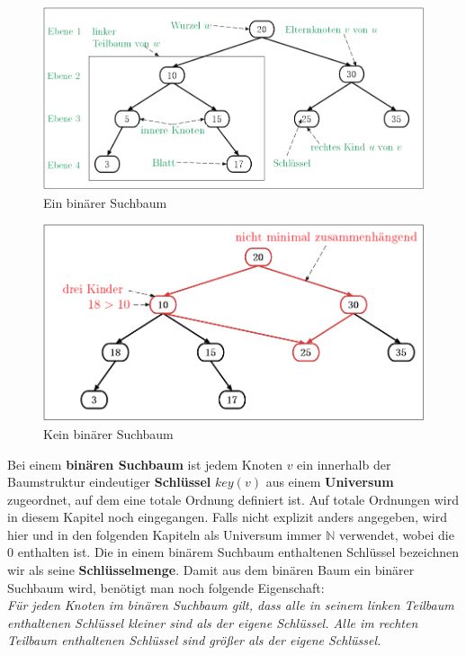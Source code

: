 \documentclass[a4paper,12pt]{article}
\begin{document}
\begin{figure}[H]
	\centering
	\includegraphics[width= 1\textwidth]{"Medien/Einleitung/ioSuchbaum"}
	\caption{Ein binärer Suchbaum }
	\label{fig:ioSuchbaum}
\end{figure}
\begin{figure}[H]
	\centering
	\includegraphics[width= 1\textwidth]{"Medien/Einleitung/nioSuchbaum"}
	\caption{Kein binärer Suchbaum }
	\label{fig:nioSuchbaum}
\end{figure}

\noindent Bei einem \textbf{binären Suchbaum} ist jedem Knoten $v$ ein innerhalb der Baumstruktur eindeutiger \textbf{Schlüssel} $\mathit{key}\left(v\right)$ aus einem \textbf{Universum} zugeordnet, auf dem eine totale Ordnung definiert ist. Auf totale Ordnungen wird in diesem Kapitel noch eingegangen. Falls nicht explizit anders angegeben, wird hier und in den folgenden Kapiteln als Universum immer $\mathbb{N}$ verwendet, wobei die $0$ enthalten ist. Die in einem binärem Suchbaum enthaltenen Schlüssel bezeichnen wir als seine \textbf{Schlüsselmenge}.  Damit aus dem binären Baum ein binärer Suchbaum wird, benötigt man noch folgende Eigenschaft:\\
\textit{Für jeden Knoten im binären Suchbaum gilt, dass alle in seinem linken Teilbaum enthaltenen Schlüssel kleiner sind als der eigene Schlüssel. Alle im rechten Teilbaum enthaltenen Schlüssel sind größer als der eigene Schlüssel.} \\
\end{document}
